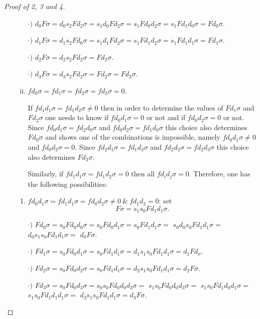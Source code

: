 \documentclass[main.tex]{subfiles}
\begin{document}
\begin{proof}[Proof of 2, 3 and 4]
\begin{enumerate}[a)]
\begin{enumerate}[i)]
        $\cdot)$ $d_0F\sigma=d_0s_2Fd_2\sigma=s_1d_0Fd_2\sigma=s_1Fd_0d_2\sigma=s_1Fd_1d_0\sigma=Fd_0\sigma$.

        $\cdot)$ $d_1F\sigma=d_1s_2Fd_0\sigma=s_1d_1Fd_2\sigma=s_1Fd_1d_2\sigma=s_1Fd_1d_1\sigma=Fd_1\sigma$.

        $\cdot)$ $d_2F\sigma=d_2s_2Fd_2\sigma=Fd_2\sigma$.

        $\cdot)$ $d_3F\sigma=d_3s_2Fd_2\sigma=Fd_2\sigma=Fd_3\sigma$.

        \item \underline{$fd_0\sigma=fd_1\sigma=fd_2\sigma=fd_3\sigma=0$}. \vspace*{5pt}\par
        If $fd_1d_1\sigma=fd_1d_2\sigma\neq 0$ then in order to determine the values of $Fd_1\sigma$ and $Fd_2\sigma$ one needs to know if $fd_0d_1\sigma=0$ or not and if $fd_0d_2\sigma=0$ or not. Since $fd_0d_1\sigma=fd_2d_0\sigma$ and $fd_0d_2\sigma=fd_1d_0\sigma$ this choice also determines $Fd_0\sigma$ and shows one of the combinations is impossible, namely $fd_0d_1\sigma\neq0$ and $fd_0d_2\sigma=0$. Since $fd_2d_1\sigma=fd_1d_3\sigma$ and $fd_2d_2\sigma=fd_2d_3\sigma$ this choice also determines $Fd_3\sigma$.\par

        Similarly, if $fd_1d_1\sigma=fd_1d_2\sigma=0$ then all $fd_id_j\sigma=0$. Therefore, one has the following possibilities:\par
        \end{enumerate}

            \begin{enumerate}[{iv}-a.]
            \item\underline{$fd_0d_1\sigma=fd_1d_1\sigma=fd_0d_2\sigma\neq0\ \&\ fd_1d_3=0$}: set
            $$F\sigma=s_1s_0Fd_1d_1\sigma.$$

            $\cdot)$ $Fd_0\sigma=s_0Fd_0d_0\sigma=s_0Fd_0d_1\sigma=s_0Fd_1d_1\sigma=$ $s_0d_0s_0Fd_1d_1\sigma=$ $d_0s_1s_0Fd_1d_1\sigma=$ $d_0F\sigma$.

            $\cdot)$ $Fd_1\sigma=s_0Fd_0d_1\sigma=s_0Fd_1d_1\sigma=d_1s_1s_0Fd_1d_1\sigma=d_1Fd_\sigma$.

            $\cdot)$ $Fd_2\sigma=s_0Fd_0d_2\sigma=s_0Fd_1d_1\sigma=d_2s_1s_0Fd_1d_1\sigma=d_2F\sigma$.

            $\cdot)$ $Fd_3\sigma=s_0Fd_0d_3\sigma=s_0s_0Fd_0d_0d_3\sigma=$ $s_1s_0Fd_0d_0d_3\sigma=$ $s_1s_0Fd_1d_0d_1\sigma=$ $s_1s_0Fd_1d_1d_1\sigma=$ $d_3s_1s_0Fd_1d_1\sigma=d_3F\sigma.$


\end{enumerate}
\end{enumerate}
\end{proof}
\end{document}
